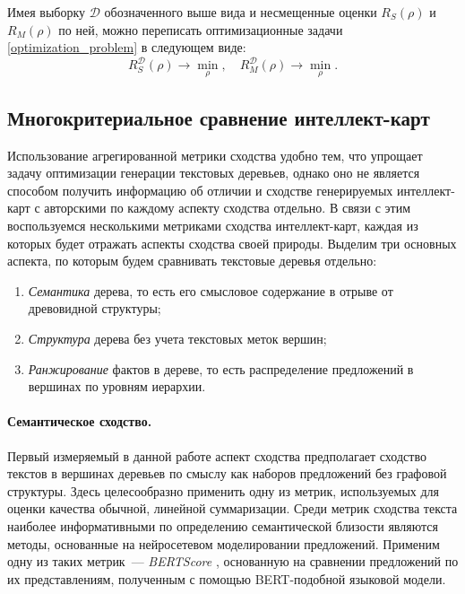 \documentclass[12pt]{article}
\begin{document}
Имея выборку $\mathcal{D}$ обозначенного выше вида и несмещенные оценки $R_S(\rho)$ и $R_M(\rho)$ по ней, можно переписать оптимизационные задачи \eqref{optimization_problem} в следующем виде:
\begin{equation} \label{optimization_problem_2}
    R_S^\mathcal{D}(\rho) \longrightarrow \min_\rho, \quad R_M^\mathcal{D}(\rho) \longrightarrow \min_\rho.
\end{equation}

\subsection{Многокритериальное сравнение интеллект-карт}
Использование агрегированной метрики сходства удобно тем, что упрощает задачу оптимизации генерации текстовых деревьев, однако оно не является способом получить информацию об отличии и сходстве генерируемых интеллект-карт с авторскими по каждому аспекту сходства отдельно. В связи с этим воспользуемся несколькими метриками сходства интеллект-карт, каждая из которых будет отражать аспекты сходства своей природы. Выделим три основных аспекта, по которым будем сравнивать текстовые деревья отдельно:
\begin{enumerate}
    \item \textit{Семантика} дерева, то есть его смысловое содержание в отрыве от древовидной структуры;
    \item \textit{Структура} дерева без учета текстовых меток вершин;
    \item \textit{Ранжирование} фактов в дереве, то есть распределение предложений в вершинах по уровням иерархии.
\end{enumerate}

\paragraph{Семантическое сходство.} Первый измеряемый в данной работе аспект сходства предполагает сходство текстов в вершинах деревьев по смыслу как наборов предложений без графовой структуры. Здесь целесообразно применить одну из метрик, используемых для оценки качества обычной, линейной суммаризации. Среди метрик сходства текста наиболее информативными по определению семантической близости являются методы, основанные на нейросетевом моделировании предложений. Применим одну из таких метрик~--- \textit{BERTScore} \cite{zhang2019bertscore}, основанную на сравнении предложений по их представлениям, полученным с помощью BERT-подобной языковой модели. 
\end{document}
